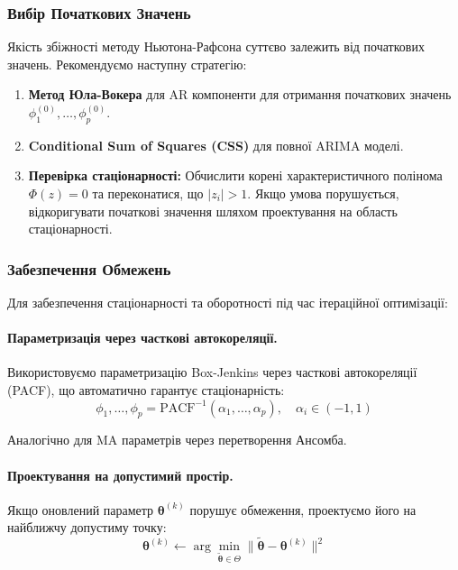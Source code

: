 \documentclass[12pt,a4paper]{article}
\begin{document}
\subsubsection{Вибір Початкових Значень}

Якість збіжності методу Ньютона-Рафсона суттєво залежить від початкових значень. Рекомендуємо наступну стратегію:

\begin{enumerate}
    \item \textbf{Метод Юла-Вокера} для AR компоненти для отримання початкових значень $\phi_1^{(0)}, \ldots, \phi_p^{(0)}$.

    \item \textbf{Conditional Sum of Squares (CSS)} для повної ARIMA моделі.

    \item \textbf{Перевірка стаціонарності:} Обчислити корені характеристичного полінома $\Phi(z) = 0$ та переконатися, що $|z_i| > 1$. Якщо умова порушується, відкоригувати початкові значення шляхом проектування на область стаціонарності.
\end{enumerate}

\subsubsection{Забезпечення Обмежень}

Для забезпечення стаціонарності та оборотності під час ітераційної оптимізації:

\paragraph{Параметризація через часткові автокореляції.}

Використовуємо параметризацію Box-Jenkins через часткові автокореляції (PACF), що автоматично гарантує стаціонарність:
\begin{equation}
\label{eq:pacf_parameterization}
\phi_1, \ldots, \phi_p = \text{PACF}^{-1}(\alpha_1, \ldots, \alpha_p), \quad \alpha_i \in (-1, 1)
\end{equation}

Аналогічно для MA параметрів через перетворення Ансомба.

\paragraph{Проектування на допустимий простір.}

Якщо оновлений параметр $\boldsymbol{\theta}^{(k)}$ порушує обмеження, проектуємо його на найближчу допустиму точку:
\begin{equation}
\label{eq:projection}
\boldsymbol{\theta}^{(k)} \leftarrow \arg\min_{\tilde{\boldsymbol{\theta}} \in \Theta} \|\tilde{\boldsymbol{\theta}} - \boldsymbol{\theta}^{(k)}\|^2
\end{equation}
\end{document}
